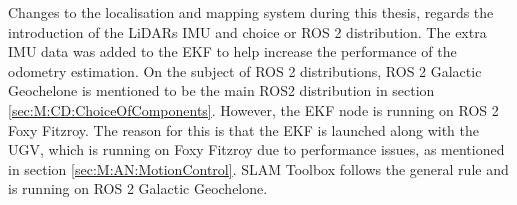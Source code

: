 Changes to the localisation and mapping system during this thesis, regards the introduction of the LiDARs IMU and choice or ROS 2 distribution. The extra IMU data was added to the EKF to help increase the performance of the odometry estimation. On the subject of ROS 2 distributions, ROS 2 Galactic Geochelone is mentioned to be the main ROS2 distribution in section \ref{sec:M:CD:ChoiceOfComponents}. However, the EKF node is running on ROS 2 Foxy Fitzroy. The reason for this is that the EKF is launched along with the UGV, which is running on Foxy Fitzroy due to performance issues, as mentioned in section \ref{sec:M:AN:MotionControl}. SLAM Toolbox follows the general rule and is running on ROS 2 Galactic Geochelone.






